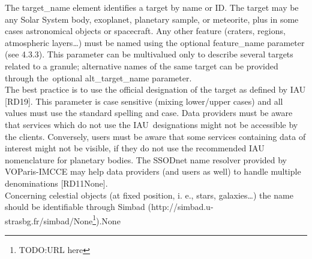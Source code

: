 \documentclass[11pt,a4paper]{ivoa}
\begin{document}
The target_name element identifies a target by name or ID. The target may be any Solar System body, exoplanet, planetary sample, or meteorite, plus in some cases astronomical objects or spacecraft. Any other feature (craters, regions, atmospheric layers…) must be named using the optional feature_name parameter (see 4.3.3). This parameter can be multivalued only to describe several targets related to a granule; alternative names of the same target can be provided through the optional alt_target_name parameter.\\
 The best practice is to use the official designation of the target as defined by IAU [RD19]. This parameter is case sensitive (mixing lower/upper cases) and all values must use the standard spelling and case. Data providers must be aware that services which do not use the IAU designations might not be accessible by the clients. Conversely, users must be aware that some services containing data of interest might not be visible, if they do not use the recommended IAU nomenclature for planetary bodies. The SSODnet name resolver provided by VOParis-IMCCE may help data providers (and users as well) to handle multiple denominations [RD11None].\\
Concerning celestial objects (at fixed position, i. e., stars, galaxies…) the name should be identifiable through Simbad (http://simbad.u-strasbg.fr/simbad/None\footnote{TODO:URL here}).None
\end{document}
